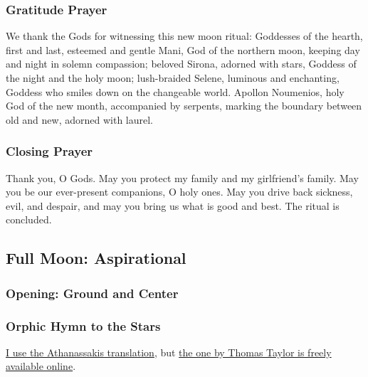 \documentclass[
]{book}
\begin{document}
\hypertarget{gratitude-prayer}{%
\subsubsection{Gratitude Prayer}\label{gratitude-prayer}}

We thank the Gods for witnessing this new moon ritual:
Goddesses of the hearth, first and last,
esteemed and gentle Mani,
God of the northern moon,
keeping day and night in solemn compassion;
beloved Sirona, adorned with stars,
Goddess of the night and the holy moon;
lush-braided Selene, luminous and enchanting,
Goddess who smiles down on the changeable world.
Apollon Noumenios, holy God of the new month,
accompanied by serpents, marking the boundary
between old and new, adorned with laurel.

\hypertarget{closing-prayer}{%
\subsubsection{Closing Prayer}\label{closing-prayer}}

Thank you, O Gods.
May you protect my family and my girlfriend's family.
May you be our ever-present companions, O holy ones.
May you drive back sickness, evil, and despair,
and may you bring us what is good and best.
The ritual is concluded.

\hypertarget{full-moon-aspirational}{%
\subsection{Full Moon: Aspirational}\label{full-moon-aspirational}}

\hypertarget{opening-ground-and-center-1}{%
\subsubsection{Opening: Ground and Center}\label{opening-ground-and-center-1}}

\hypertarget{orphic-hymn-to-the-stars}{%
\subsubsection{Orphic Hymn to the Stars}\label{orphic-hymn-to-the-stars}}

\href{https://www.press.jhu.edu/books/title/9661/orphic-hymns}{I use the Athanassakis translation}, but \href{https://www.theoi.com/Text/OrphicHymns1.html\#6}{the one by Thomas Taylor is freely available online}.
\end{document}
